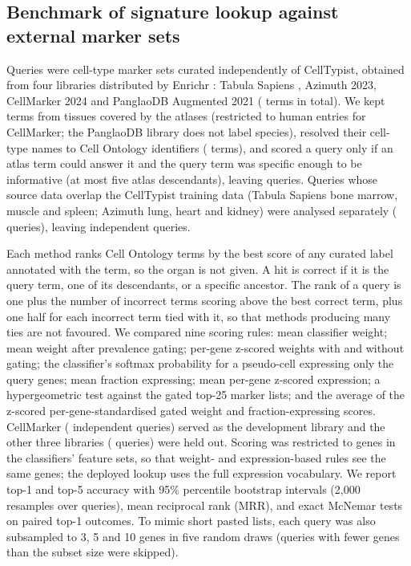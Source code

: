 \documentclass[11pt]{article}
\begin{document}
\subsection{Benchmark of signature lookup against external marker sets}

Queries were cell-type marker sets curated independently of CellTypist, obtained from four libraries distributed by Enrichr \cite{kuleshov2016}: Tabula Sapiens \cite{tabulasapiens2022}, Azimuth 2023, CellMarker 2024 and PanglaoDB Augmented 2021 (\lkTerms{} terms in total). We kept terms from tissues covered by the atlases (restricted to human entries for CellMarker; the PanglaoDB library does not label species), resolved their cell-type names to Cell Ontology identifiers (\lkResolved{} terms), and scored a query only if an atlas term could answer it and the query term was specific enough to be informative (at most five atlas descendants), leaving \lkScored{} queries. Queries whose source data overlap the CellTypist training data (Tabula Sapiens bone marrow, muscle and spleen; Azimuth lung, heart and kidney) were analysed separately (\lkOverlap{} queries), leaving \lkIndependent{} independent queries.

Each method ranks Cell Ontology terms by the best score of any curated label annotated with the term, so the organ is not given. A hit is correct if it is the query term, one of its descendants, or a specific ancestor. The rank of a query is one plus the number of incorrect terms scoring above the best correct term, plus one half for each incorrect term tied with it, so that methods producing many ties are not favoured. We compared nine scoring rules: mean classifier weight; mean weight after prevalence gating; per-gene z-scored weights with and without gating; the classifier's softmax probability for a pseudo-cell expressing only the query genes; mean fraction expressing; mean per-gene z-scored expression; a hypergeometric test against the gated top-25 marker lists; and the average of the z-scored per-gene-standardised gated weight and fraction-expressing scores. CellMarker (\lkDev{} independent queries) served as the development library and the other three libraries (\lkTest{} queries) were held out. Scoring was restricted to genes in the classifiers' feature sets, so that weight- and expression-based rules see the same genes; the deployed lookup uses the full expression vocabulary. We report top-1 and top-5 accuracy with 95\% percentile bootstrap intervals (2{,}000 resamples over queries), mean reciprocal rank (MRR), and exact McNemar tests on paired top-1 outcomes. To mimic short pasted lists, each query was also subsampled to 3, 5 and 10 genes in five random draws (queries with fewer genes than the subset size were skipped).
\end{document}
